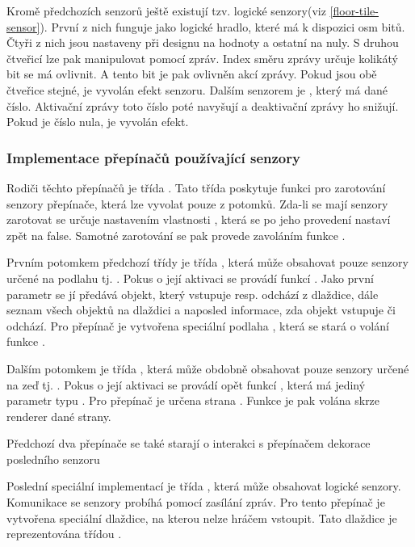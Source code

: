 Kromě předchozích senzorů ještě existují tzv. logické senzory(viz \ref{floor-tile-sensor}). První z nich  funguje 
jako logické hradlo, které má k dispozici osm bitů. Čtyři z nich jsou nastaveny při designu na hodnoty a ostatní na nuly. 
S druhou čtveřicí lze pak manipulovat pomocí zpráv. Index směru zprávy určuje kolikátý bit se má ovlivnit. A tento bit
je pak ovlivněn akcí zprávy. Pokud jsou obě čtveřice stejné, je vyvolán efekt senzoru. Dalším
senzorem je , který má dané číslo. Aktivační zprávy toto číslo poté navyšují a deaktivační zprávy
ho snižují. Pokud je číslo  nula, je vyvolán efekt.
 
\subsubsection{Implementace přepínačů používající senzory}

Rodiči těchto přepínačů je třída . Tato třída poskytuje funkci pro zarotování senzory přepínače, která
lze vyvolat pouze z potomků. Zda-li se mají senzory zarotovat se určuje nastavením vlastnosti , která se po jeho 
provedení nastaví zpět na false. Samotné zarotování se pak provede zavoláním funkce .

Prvním potomkem předchozí třídy je třída , která může obsahovat pouze senzory určené
na podlahu tj. . Pokus o její aktivaci se provádí funkcí . Jako první parametr se jí předává objekt,
který vstupuje resp. odchází z dlaždice, dále seznam všech objektů na dlaždici a naposled informace, zda objekt
vstupuje či odchází. Pro přepínač je vytvořena speciální podlaha , která se stará 
o volání funkce .

Dalším potomkem je třída , která může obdobně obsahovat pouze senzory určené na zeď tj. .
Pokus o její aktivaci se provádí opět funkcí , která má jediný parametr typu . Pro přepínač
je určena strana . Funkce  je pak volána skrze renderer dané strany. 

Předchozí dva přepínače se také starají o interakci s přepínačem dekorace posledního senzoru

Poslední speciální implementací je třída , která může obsahovat logické senzory.
Komunikace se senzory probíhá pomocí zasílání zpráv. Pro tento přepínač je vytvořena speciální dlaždice,
na kterou nelze hráčem vstoupit. Tato dlaždice je reprezentována třídou . 


